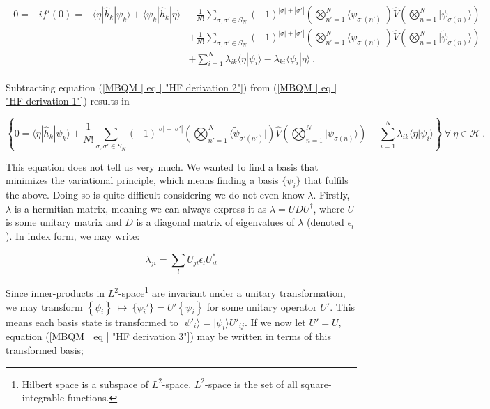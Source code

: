 \documentclass[10pt,twoside]{report}
\begin{document}
	\begin{align}
		\begin{split}
			0 = -if'(0) =  -\langle\eta|\hat{h}_k|\psi_k\rangle + \langle\psi_k|\hat{h}_k|\eta\rangle &- \frac{1}{N!}\sum_{\sigma,\sigma'\in S_N} (-1)^{|\sigma|+|\sigma'|}\left(\bigotimes_{n'=1}^N \langle\widetilde{\psi}_{\sigma'(n')}|\right)\hat{V}\left(\bigotimes_{n=1}^N |\psi_{\sigma(n)}\rangle\right)\\
			&+ \frac{1}{N!}\sum_{\sigma,\sigma'\in S_N} (-1)^{|\sigma|+|\sigma'|}\left(\bigotimes_{n'=1}^N \langle\psi_{\sigma'(n')}|\right)\hat{V}\left(\bigotimes_{n=1}^N |\widetilde{\psi}_{\sigma(n)}\rangle\right)\\
			&+ \sum_{i=1}^N \lambda_{ik}\langle\eta|\psi_i\rangle - \lambda_{ki}\langle\psi_i|\eta\rangle \:.
			\label{MBQM | eq | "HF derivation 2"}
		\end{split}
	\end{align}
	
	Subtracting equation (\ref{MBQM | eq | "HF derivation 2"}) from (\ref{MBQM | eq | "HF derivation 1"}) results in
	
	\begin{equation}
		\left\{0 = \langle\eta|\hat{h}_k|\psi_k\rangle + \frac{1}{N!}\sum_{\sigma,\sigma'\in S_N} (-1)^{|\sigma|+|\sigma'|}\left(\bigotimes_{n'=1}^N \langle\widetilde{\psi}_{\sigma'(n')}|\right)\hat{V}\left(\bigotimes_{n=1}^N |\psi_{\sigma(n)}\rangle\right)
		- \sum_{i=1}^N \lambda_{ik}\langle\eta|\psi_i\rangle\right\} \: \forall\:\eta\in\mathcal{H} \:.
		\label{MBQM | eq | "HF derivation 3"}
	\end{equation}
	
	This equation does not tell us very much. We wanted to find a basis that minimizes the variational principle, which means finding a basis $\{\psi_i\}$ that fulfils the above. Doing so is quite difficult considering we do not even know $\lambda$. Firstly, $\lambda$ is a hermitian matrix, meaning we can always express it as $\lambda = UDU^\dagger$, where $U$ is some unitary matrix and $D$ is a diagonal matrix of eigenvalues of $\lambda$ (denoted $\epsilon_i$). In index form, we may write:
	
	\begin{equation}
		\lambda_{ji} = \sum_l U_{jl}\epsilon_lU_{il}^*
	\end{equation}
	
	Since inner-products in $L^2$-space\footnote{Hilbert space is a subspace of $L^2$-space. $L^2$-space is the set of all square-integrable functions.} are invariant under a unitary transformation, we may transform $\left\{\psi_i\right\} \:\mapsto\: \{\psi_i'\} = U'\left\{\psi_i\right\}$ for some unitary operator $U'$. This means each basis state is transformed to $|\psi'_i\rangle = |\psi_i\rangle U'_{ij}$. If we now let $U'=U$, equation (\ref{MBQM | eq | "HF derivation 3"}) may be written in terms of this transformed basis;
	
\end{document}
